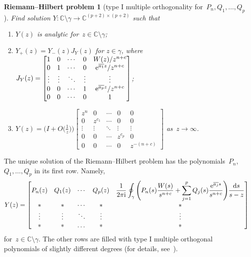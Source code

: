 \documentclass[pdftex]{sigma}
\numberwithin{equation}{section}
\newtheorem*{rhproblem}{Riemann--Hilbert problem}
{ \theoremstyle{definition}
 \newtheorem{Definition}[Theorem]{Definition}
 \newtheorem{Note}[Theorem]{Note}
 \newtheorem{Example}[Theorem]{Example}
 \newtheorem{Remark}[Theorem]{Remark}
}
\newcommand*{\Cset}{\mathbb{C}} %
\begin{document}
 \begin{rhproblem}[type I multiple orthogonality for~$P_n,Q_1,\dots,Q_p$]
 Find solution $Y\colon \Cset \setminus \gamma \to \Cset^{(p+2) \times (p+2)}$
 such that
 \begin{enumerate}
 \item[$(1)$] $Y(z)$ is analytic for~$z \in \Cset \setminus \gamma$;

 \item[$(2)$] $Y_+(z) = Y_-(z) J_Y(z)$ for $z \in \gamma$, where
$
 J_Y(z) =
 \begin{bmatrix}
 1 & 0&\cdots &0& W(z)/z^{n+c}\\
 0 & 1& \cdots &0& {\rm e}^{\overline{a_1} z}/z^{n+c}\\
 \vdots & \vdots&\ddots&\vdots&\vdots\\
 0 & 0& \cdots &1& {\rm e}^{\overline{a_p} z}/z^{n+c}\\
 0&0&\cdots&0& 1
 \end{bmatrix}$;

 \item[$(3)$] $Y(z) = \big(I + O\big(\frac{1}{z}\big)\big)
 \begin{bmatrix}
 z^n&0&\cdots&0&0\\
 0&z^{c_1}&\cdots& 0&0\\
 \vdots&\vdots& \ddots&\vdots&\vdots\\
 0&0&\cdots&z^{c_p}&0\\
 0&0&\cdots&0&z^{-(n+c)}
 \end{bmatrix}
 $ as~$z \to \infty$.
 \end{enumerate}
 \end{rhproblem}

 The unique solution of the Riemann--Hilbert problem has the polynomials~$P_n$, $Q_1, \dots, Q_p$ in its first row. Namely,
 \begin{equation*}
 Y(z)=
 \begin{bmatrix}
 P_n(z) & Q_1(z)&\cdots& Q_p(z)& \displaystyle \frac{1}{2 \pi {\rm i}} \oint_\gamma \Bigg(P_n(s) \frac{W(s)}{s^{n+c}} + \sum_{j=1}^pQ_j(s)\frac{{\rm e}^{\overline{a_j}s}}{s^{n+c}}\Bigg)\frac{{\rm d}s}{s-z}\\
 * & * & \cdots &*&*\\
 \vdots & \vdots & \ddots & \vdots&\vdots\\
 * & * & \dots &*&*
 \end{bmatrix}
 \end{equation*}
 for~$z \in \Cset \setminus \gamma$. The other rows are filled with type I multiple orthogonal polynomials of slightly different degrees (for details, see~\cite{VAGK}).
\end{document}
